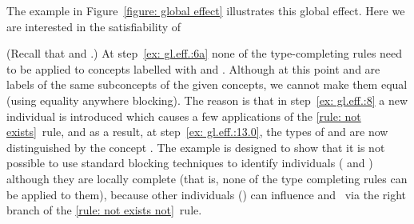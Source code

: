 \documentclass[leqno
,pdflatex
,prodmode
,acmtocl
]{acmsmall}
\begin{document}
The example in Figure~\ref{figure: global effect} illustrates this
global effect.
Here we are interested in the satisfiability of 

(Recall that  and .)
At step~\ref{ex: gl.eff.:6a}
none of the type-completing rules need to be applied to
concepts labelled with  and .
Although at this point  and  are labels of the same subconcepts of the
given concepts,
we cannot make them equal (using equality anywhere blocking).
The reason is that
in step~\ref{ex: gl.eff.:8}
a new individual is introduced 
which causes a few applications of the \eqref{rule: not exists}~rule,
and
as a result, at step~\ref{ex: gl.eff.:13.0}, the types of
 and  are now distinguished by the concept .
The example is designed to show that it is not possible
to use standard blocking techniques
to identify individuals ( and )
although they are locally complete (that is, none of the type completing rules can be applied to them),
because other individuals () can influence  and~
via the right branch of the \eqref{rule: not exists not}~rule.
\end{document}
